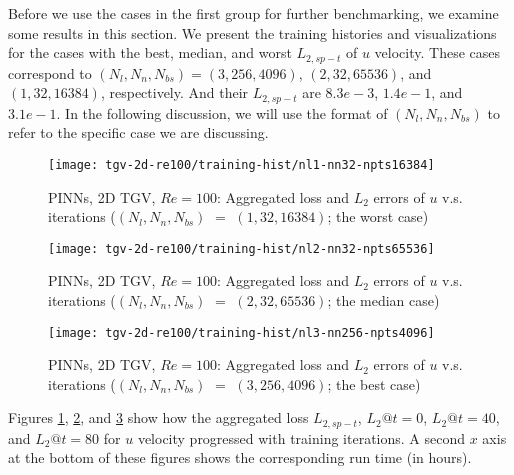 
Before we use the cases in the first group for further benchmarking, we examine some results in this section.
We present the training histories and visualizations for the cases with the best, median, and worst $L_{2,sp-t}$ of $u$ velocity.
These cases correspond to $(N_l, N_n, N_{bs}) = (3, 256, 4096)$, $(2, 32, 65536)$, and $(1, 32, 16384)$, respectively.
And their $L_{2,sp-t}$ are $8.3e-3$, $1.4e-1$, and $3.1e-1$.
In the following discussion, we will use the format of $(N_l, N_n, N_{bs})$ to refer to the specific case we are discussing.

\begin{figure}[hbt!]
\centering%
\texttt{[image: tgv-2d-re100/training-hist/nl1-nn32-npts16384]}%
\caption[%
    PINNs, 2D TGV, $Re=100$: Aggregated loss and $L_2$ errors of $u$ v.s. iterations ($(N_l, N_n, N_{bs})=(1, 32, 16384)$; the worst case)%
]{%
    PINNs, 2D TGV, $Re=100$: Aggregated loss and $L_2$ errors of $u$ v.s. iterations ($(N_l, N_n, N_{bs})$ $=$ $(1, 32, 16384)$; the worst case)%
}\label{fig:nl1-nn32-npts16384-loss-err-hist}%
\end{figure}

\begin{figure}[hbt!]
\centering%
\texttt{[image: tgv-2d-re100/training-hist/nl2-nn32-npts65536]}%
\caption[%
    PINNs, 2D TGV, $Re=100$: Aggregated loss and $L_2$ errors of $u$ v.s. iterations ($(N_l, N_n, N_{bs})=(2, 32, 65536)$; the median case)%
]{%
    PINNs, 2D TGV, $Re=100$: Aggregated loss and $L_2$ errors of $u$ v.s. iterations ($(N_l, N_n, N_{bs})$ $=$ $(2, 32, 65536)$; the median case)%
}\label{fig:nl2-nn32-npts65536-loss-err-hist}%
\end{figure}

\begin{figure}[hbt!]
\centering%
\texttt{[image: tgv-2d-re100/training-hist/nl3-nn256-npts4096]}%
\caption[%
    PINNs, 2D TGV, $Re=100$: Aggregated loss and $L_2$ errors of $u$ v.s. iterations ($(N_l, N_n, N_{bs})=(3, 256, 4096)$; the best case)%
]{%
    PINNs, 2D TGV, $Re=100$: Aggregated loss and $L_2$ errors of $u$ v.s. iterations ($(N_l, N_n, N_{bs})$ $=$ $(3, 256, 4096)$; the best case)%
}\label{fig:nl3-nn256-npts4096-loss-err-hist}%
\end{figure}

Figures \ref{fig:nl1-nn32-npts16384-loss-err-hist}, \ref{fig:nl2-nn32-npts65536-loss-err-hist}, and \ref{fig:nl3-nn256-npts4096-loss-err-hist} show how the aggregated loss $L_{2,sp-t}$, $L_2@t=0$, $L_2@t=40$, and $L_2@t=80$ for $u$ velocity progressed with training iterations.
A second $x$ axis at the bottom of these figures shows the corresponding run time (in hours).

